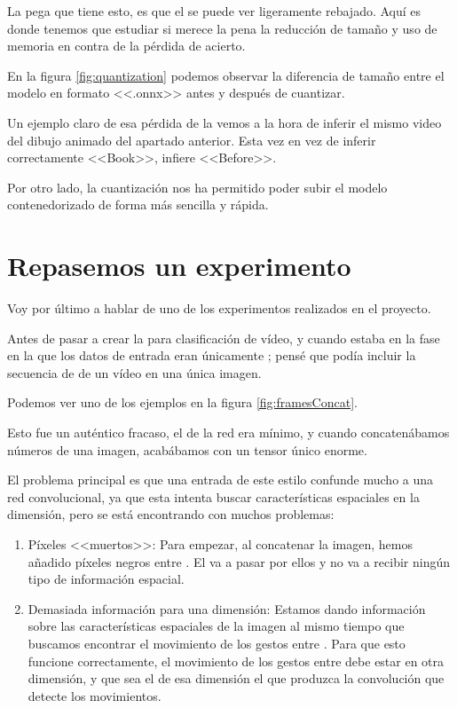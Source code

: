 La pega que tiene esto, es que el  se puede ver ligeramente rebajado. Aquí es donde tenemos que estudiar si merece la pena la reducción de tamaño y uso de memoria en contra de la pérdida de acierto.

En la figura \ref{fig:quantization} podemos observar la diferencia de tamaño entre el modelo en formato <<.onnx>> antes y después de cuantizar.


Un ejemplo claro de esa pérdida de  la vemos a la hora de inferir el mismo video del dibujo animado del apartado anterior. Esta vez en vez de inferir correctamente <<Book>>, infiere <<Before>>.

Por otro lado, la cuantización nos ha permitido poder subir el modelo contenedorizado de forma más sencilla y rápida.

\section{Repasemos un experimento}

Voy por último a hablar de uno de los experimentos realizados en el proyecto.

Antes de pasar a crear la  para clasificación de vídeo, y cuando estaba en la fase en la que los datos de entrada eran únicamente ; pensé que podía incluir la secuencia de  de un vídeo en una única imagen.

Podemos ver uno de los ejemplos en la figura \ref{fig:framesConcat}.


Esto fue un auténtico fracaso, el  de la red era mínimo, y cuando concatenábamos números  de una imagen, acabábamos con un tensor único enorme.

El problema principal es que una entrada de este estilo confunde mucho a una red convolucional, ya que esta intenta buscar características espaciales en la dimensión, pero se está encontrando con muchos problemas:

\begin{enumerate}
  \item Píxeles <<muertos>>: Para empezar, al concatenar la imagen, hemos añadido píxeles negros entre . El  va a pasar por ellos y no va a recibir ningún tipo de información espacial.
  \item Demasiada información para una dimensión: Estamos dando información sobre las características espaciales de la imagen al mismo tiempo que buscamos encontrar el movimiento de los gestos entre 
        . Para que esto funcione correctamente, el movimiento de los gestos entre 
        debe estar en otra dimensión, y que sea el  de esa dimensión el que produzca la convolución que detecte los movimientos.
\end{enumerate}

